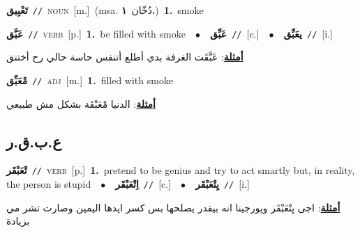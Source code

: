 \documentclass[10pt,a4paper,twoside]{article} %
\begin{document}
\begin{multicols}{2}
{\setlength\topsep{0pt}\textbf{\foreignlanguage{arabic}{تَعْبِيق}}\ {\color{gray}\texttt{//}\color{black}}\ \textsc{noun}\ [m.]\ \color{gray}(msa. \foreignlanguage{arabic}{دُخّان}~\foreignlanguage{arabic}{\textbf{١.}})\color{black}\ \textbf{1.}~smoke\ } \vspace{2mm}

{\setlength\topsep{0pt}\textbf{\foreignlanguage{arabic}{عَبَّق}}\ {\color{gray}\texttt{//}\color{black}}\ \textsc{verb}\ [p.]\ \textbf{1.}~be filled with smoke\ \ $\bullet$\ \ \setlength\topsep{0pt}\textbf{\foreignlanguage{arabic}{عَبِّق}}\ {\color{gray}\texttt{//}\color{black}}\ [c.]\ \ $\bullet$\ \ \setlength\topsep{0pt}\textbf{\foreignlanguage{arabic}{يعَبِّق}}\ {\color{gray}\texttt{//}\color{black}}\ [i.]\  \begin{flushright}\color{gray}\foreignlanguage{arabic}{\textbf{\underline{\foreignlanguage{arabic}{أمثلة}}}: عَبَّقَت الغرفة بدي أطلع أتنفس حاسة حالي رح أختنق}\end{flushright}\color{black}} \vspace{2mm}

{\setlength\topsep{0pt}\textbf{\foreignlanguage{arabic}{مْعَبِّق}}\ {\color{gray}\texttt{//}\color{black}}\ \textsc{adj}\ [m.]\ \textbf{1.}~filled with smoke\  \begin{flushright}\color{gray}\foreignlanguage{arabic}{\textbf{\underline{\foreignlanguage{arabic}{أمثلة}}}: الدنيا مْعَبْقَة بشكل مش طبيعي}\end{flushright}\color{black}} \vspace{2mm}

\vspace{-3mm}
\subsection*{\color{blue}\foreignlanguage{arabic}{ع.ب.ق.ر}\color{blue}{}} 

{\setlength\topsep{0pt}\textbf{\foreignlanguage{arabic}{تْعَبْقَر}}\ {\color{gray}\texttt{//}\color{black}}\ \textsc{verb}\ [p.]\ \textbf{1.}~pretend to be genius and try to act smartly but, in reality, the person is stupid\ \ $\bullet$\ \ \setlength\topsep{0pt}\textbf{\foreignlanguage{arabic}{اِتْعَبْقَر}}\ {\color{gray}\texttt{//}\color{black}}\ [c.]\ \ $\bullet$\ \ \setlength\topsep{0pt}\textbf{\foreignlanguage{arabic}{يِتْعَبْقَر}}\ {\color{gray}\texttt{//}\color{black}}\ [i.]\  \begin{flushright}\color{gray}\foreignlanguage{arabic}{\textbf{\underline{\foreignlanguage{arabic}{أمثلة}}}: اجى يِتْعَبْقَر ويورجينا انه بيقدر يصلحها بس كسر ايدها اليمين وصارت تشر مي بزيادة}\end{flushright}\color{black}} \vspace{2mm}


\end{multicols}
\end{document}
